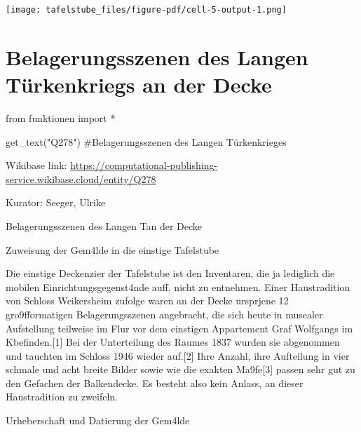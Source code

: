 \documentclass[
  a4paper,
  portrait]{book}
\newenvironment{Shaded}{\begin{snugshade}}{\end{snugshade}}
\newcommand{\CommentTok}[1]{\textcolor[rgb]{0.37,0.37,0.37}{#1}}
\newcommand{\ImportTok}[1]{\textcolor[rgb]{0.00,0.46,0.62}{#1}}
\newcommand{\NormalTok}[1]{\textcolor[rgb]{0.00,0.23,0.31}{#1}}
\newcommand{\OperatorTok}[1]{\textcolor[rgb]{0.37,0.37,0.37}{#1}}
\newcommand{\StringTok}[1]{\textcolor[rgb]{0.13,0.47,0.30}{#1}}
\begin{document}
\texttt{[image: tafelstube\_files/figure-pdf/cell-5-output-1.png]}

\part{Belagerungsszenen des Langen Türkenkriegs an der Decke}

\begin{Shaded}
\begin{Highlighting}[]
\ImportTok{from}\NormalTok{ funktionen }\ImportTok{import} \OperatorTok{*}
\end{Highlighting}
\end{Shaded}

\begin{Shaded}
\begin{Highlighting}[]
\NormalTok{get\_text(}\StringTok{"Q278"}\NormalTok{)}
\CommentTok{\#Belagerungsszenen des Langen Türkenkrieges}
\end{Highlighting}
\end{Shaded}

Wikibase link:
\url{https://computational-publishing-service.wikibase.cloud/entity/Q278}

Kurator: Seeger, Ulrike

Belagerungsszenen des Langen T\xbcrkenkriegs an der Decke

Zuweisung der Gem\xa4lde in die einstige Tafelstube

Die einstige Deckenzier der Tafelstube ist den Inventaren, die ja
lediglich die mobilen Einrichtungsgegenst\xa4nde auff\xbchren,
nicht zu entnehmen. Einer Haustradition von Schloss Weikersheim zufolge
waren an der Decke urspr\xbcnglich jene 12 gro\x9fformatigen
Belagerungsszenen angebracht, die sich heute in musealer Aufstellung
teilweise im Flur vor dem einstigen Appartement Graf Wolfgangs im
K\xbcchenbau befinden.{[}1{]} Bei der Unterteilung des Raumes 1837
wurden sie abgenommen und tauchten im Schloss 1946 wieder auf.{[}2{]}
Ihre Anzahl, ihre Aufteilung in vier schmale und acht breite Bilder
sowie wie die exakten Ma\x9fe{[}3{]} passen sehr gut zu den Gefachen
der Balkendecke. Es besteht also kein Anlass, an dieser Haustradition zu
zweifeln.

Urheberschaft und Datierung der Gem\xa4lde
\end{document}
